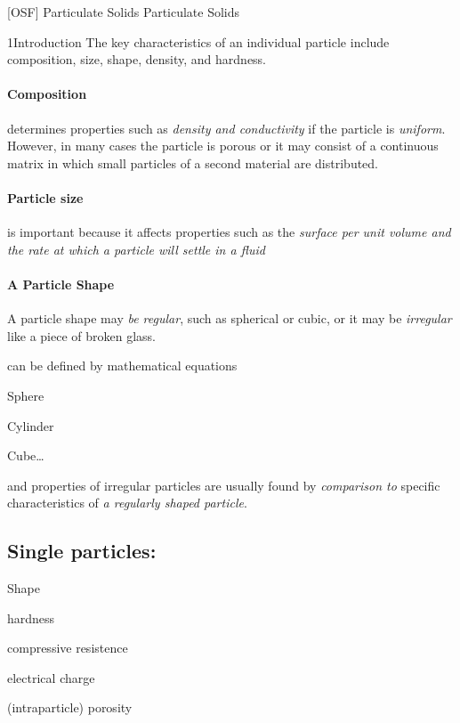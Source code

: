 \documentclass[OSF-Notebook.tex]{subfiles}
\begin{document}
[OSF]
{Particulate Solids} %
{Particulate Solids} %

\begin{sectionBox}1{Introduction} %
  The key characteristics of an individual particle include composition, size, shape, density, and hardness.
  \paragraph*{Composition} determines properties such as \emph{density and conductivity} if the particle is \emph{uniform}. However, in many cases the particle is porous or it may consist of a continuous matrix in which small particles of a second material are distributed.
  \paragraph*{Particle size} is important because it affects properties such as the \emph{surface per unit volume and the rate at which a particle will settle in a fluid}
  \paragraph*{A Particle Shape} A particle shape may \emph{be regular}, such as spherical or cubic, or it may be \emph{irregular} like a piece of broken glass.
  \begin{description}[
    leftmargin=!,
    labelwidth=\widthof{Irregular} %
  ]
    \item[Regular] can be defined by mathematical equations
      \begin{itemize}
        \begin{multicols}{4}
          \item Sphere
          \item Cylinder
          \item Cube\dots
          \end{multicols}
      \end{itemize}

    \item[Irregular] and properties of irregular particles are usually found by \emph{comparison to} specific characteristics of \emph{a regularly shaped particle}.
  \end{description}

  \subsection*{Single particles:}
  \begin{itemize}
    \begin{multicols}{2}
      \item Shape
      \item hardness
      \item compressive resistence
      \item electrical charge
      \item (intraparticle) porosity
      \end{multicols}
  \end{itemize}


\end{sectionBox}
\end{document}
